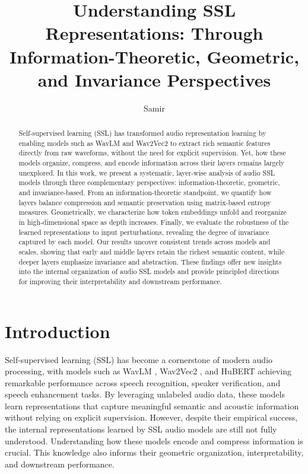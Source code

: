 \documentclass{Interspeech}
\title{Understanding SSL Representations: Through Information-Theoretic, Geometric, and Invariance Perspectives}
\author[affiliation={1}]{Samir}{Sadok}
\affiliation{First Department}{First Affiliation}{First Country}
\begin{document}
\maketitle

\begin{abstract}
Self-supervised learning (SSL) has transformed audio representation learning by enabling models such as WavLM and Wav2Vec2 to extract rich semantic features directly from raw waveforms, without the need for explicit supervision. Yet, how these models organize, compress, and encode information across their layers remains largely unexplored.
In this work, we present a systematic, layer-wise analysis of audio SSL models through three complementary perspectives: information-theoretic, geometric, and invariance-based. From an information-theoretic standpoint, we quantify how layers balance compression and semantic preservation using matrix-based entropy measures. Geometrically, we characterize how token embeddings unfold and reorganize in high-dimensional space as depth increases. Finally, we evaluate the robustness of the learned representations to input perturbations, revealing the degree of invariance captured by each model.
Our results uncover consistent trends across models and scales, showing that early and middle layers retain the richest semantic content, while deeper layers emphasize invariance and abstraction. These findings offer new insights into the internal organization of audio SSL models and provide principled directions for improving their interpretability and downstream performance.
\end{abstract}



\section{Introduction}
Self-supervised learning (SSL) has become a cornerstone of modern audio processing, with models such as WavLM \cite{chen2022wavlm}, Wav2Vec2 \cite{baevski2020wav2vec}, and HuBERT \cite{hsu2021hubert} achieving remarkable performance across speech recognition, speaker verification, and speech enhancement tasks. By leveraging unlabeled audio data, these models learn representations that capture meaningful semantic and acoustic information without relying on explicit supervision. However, despite their empirical success, the internal representations learned by SSL audio models are still not fully understood. Understanding how these models encode and compress information is crucial. This knowledge also informs their geometric organization, interpretability, and downstream performance.
\end{document}
